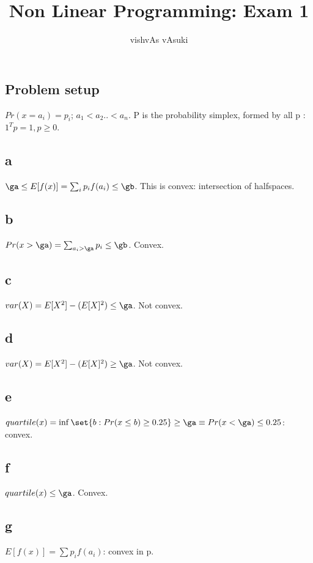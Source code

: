 \documentclass{article}
\title{Non Linear Programming: Exam 1}
\author{vishvAs vAsuki}
\begin{document}
\maketitle

\section{}
\subsection{Problem setup}
$Pr(x = a_i) = p_i$; $a_1 < a_2 .. < a_n$. P is the probability simplex, formed by all p : $1^{T}p = 1, p \geq 0$.

\subsection{a}
$\ga \leq E[f(x)] = \sum_i p_i f(a_i)\leq \gb$. This is convex: intersection of halfspaces.

\subsection{b}
$Pr(x>\ga) = \sum_{a_i> \ga}p_i \leq \gb$. Convex.

\subsection{c}
$var(X) = E[X^{2}] - (E[X]^{2})\leq \ga$. Not convex.

\subsection{d}
$var(X) = E[X^{2}] - (E[X]^{2})\geq \ga$. Not convex.

\subsection{e}
$quartile(x) = \inf\set{b: Pr(x \leq b) \geq 0.25} \geq \ga \equiv Pr(x < \ga) \leq 0.25$: convex.

\subsection{f}
$quartile(x) \leq \ga$. Convex.

\subsection{g}
$E[f(x)] = \sum p_i f(a_i)$: convex in p.
\end{document}
